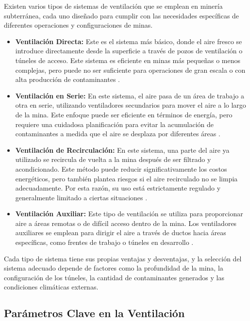 Existen varios tipos de sistemas de ventilación que se emplean en minería subterránea, cada uno diseñado para cumplir con las necesidades específicas de diferentes operaciones y configuraciones de minas.

\begin{itemize}
    \item \textbf{Ventilación Directa:} Este es el sistema más básico, donde el aire fresco se introduce directamente desde la superficie a través de pozos de ventilación o túneles de acceso. Este sistema es eficiente en minas más pequeñas o menos complejas, pero puede no ser suficiente para operaciones de gran escala o con alta producción de contaminantes \cite{mutmansky2010ventilation}.

    \item \textbf{Ventilación en Serie:} En este sistema, el aire pasa de un área de trabajo a otra en serie, utilizando ventiladores secundarios para mover el aire a lo largo de la mina. Este enfoque puede ser eficiente en términos de energía, pero requiere una cuidadosa planificación para evitar la acumulación de contaminantes a medida que el aire se desplaza por diferentes áreas \cite{mcpherson1993subsurface}.

    \item \textbf{Ventilación de Recirculación:} En este sistema, una parte del aire ya utilizado se recircula de vuelta a la mina después de ser filtrado y acondicionado. Este método puede reducir significativamente los costos energéticos, pero también plantea riesgos si el aire recirculado no se limpia adecuadamente. Por esta razón, su uso está estrictamente regulado y generalmente limitado a ciertas situaciones \cite{mutmansky2010ventilation}.

    \item \textbf{Ventilación Auxiliar:} Este tipo de ventilación se utiliza para proporcionar aire a áreas remotas o de difícil acceso dentro de la mina. Los ventiladores auxiliares se emplean para dirigir el aire a través de ductos hacia áreas específicas, como frentes de trabajo o túneles en desarrollo \cite{hartman1997mine}.
\end{itemize}

Cada tipo de sistema tiene sus propias ventajas y desventajas, y la selección del sistema adecuado depende de factores como la profundidad de la mina, la configuración de los túneles, la cantidad de contaminantes generados y las condiciones climáticas externas.

\subsection{Parámetros Clave en la Ventilación}

